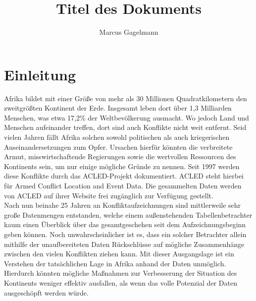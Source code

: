 \documentclass[usegeometry=true]{scrartcl}
\begin{document}
\subject{Projektbericht zum Modul Information Retrieval und Visualisierung Sommersemester 2021}
\title{Titel des Dokuments}
\author{Marcus Gagelmann}%
\maketitle%

\section{Einleitung}
Afrika bildet mit einer Größe von mehr als 30 Millionen Quadratkilometern den zweitgrößten Kontinent der Erde. Insgesamt leben dort über 1,3 Milliarden Menschen, was etwa 17,2\% der Weltbevölkerung ausmacht. Wo jedoch Land und Menschen aufeinander treffen, dort sind auch Konflikte nicht weit entfernt. Seid vielen Jahren fällt Afrika solchen sowohl politischen als auch kriegerischen Auseinandersetzungen zum Opfer. Ursachen hierfür könnten die verbreitete Armut, misswirtschaftende Regierungen sowie die wertvollen Ressourcen des Kontinents sein, um nur einige mögliche Gründe zu nennen. Seit 1997 werden diese Konflikte durch das ACLED-Projekt dokumentiert. ACLED steht hierbei für \glqq Armed Conflict Location and Event Data\grqq{}. Die gesammelten Daten werden von ACLED auf ihrer Website \cite{acled} frei zugänglich zur Verfügung gestellt.\\

Nach nun beinahe 25 Jahren an Konfliktaufzeichnungen sind mittlerweile sehr große Datenmengen entstanden, welche einem außenstehenden Tabellenbetrachter kaum einen Überblick über das gesamtgeschehen seit dem Aufzeichnungsbeginn geben können. Noch unwahrscheinlicher ist es, dass ein solcher Betrachter allein mithilfe der unaufbereiteten Daten Rückschlüsse auf mögliche Zusammenhänge zwischen den vielen Konflikten ziehen kann. Mit dieser Ausgangslage ist ein Verstehen der tatsächlichen Lage in Afrika anhand der Daten unmöglich. Hierdurch könnten mögliche Maßnahmen zur Verbesserung der Situation des Kontinents weniger effektiv ausfallen, als wenn das volle Potenzial der Daten ausgeschöpft werden würde.\\
\end{document}

